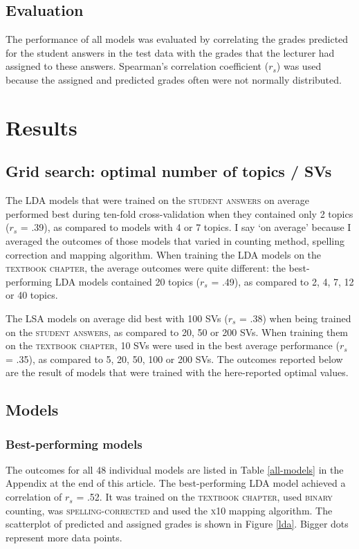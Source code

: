 \documentclass[a4paper,10pt,twoside]{article}
\begin{document}
\subsection{Evaluation}
\label{sec:evaluation}
The performance of all models was evaluated by correlating the grades predicted for the student answers in the test data with the grades that the lecturer had assigned to these answers. Spearman's correlation coefficient ($\textit{r}_s$) was used because the assigned and predicted grades often were not normally distributed.

\section{Results}

\subsection{Grid search: optimal number of topics / SVs}
The LDA models that were trained on the \textsc{student answers} on average performed best during ten-fold cross-validation when they contained only 2 topics ($\textit{r}_s$ = .39), as compared to models with 4 or 7 topics. I say `on average' because I averaged the outcomes of those models that varied in counting method, spelling correction and mapping algorithm. When training the LDA models on the \textsc{textbook chapter}, the average outcomes were quite different: the best-performing LDA models contained 20 topics ($\textit{r}_s$ = .49), as compared to 2, 4, 7, 12 or 40 topics.

The LSA models on average did best with 100 SVs ($\textit{r}_s$ = .38) when being trained on the \textsc{student answers}, as compared to 20, 50 or 200 SVs. When training them on the \textsc{textbook chapter}, 10 SVs were used in the best average performance ($\textit{r}_s$ = .35), as compared to 5, 20, 50, 100 or 200 SVs. The outcomes reported below are the result of models that were trained with the here-reported optimal values.

\subsection{Models}

\subsubsection{Best-performing models}
The outcomes for all 48 individual models are listed in Table \ref{all-models} in the Appendix at the end of this article. The best-performing LDA model achieved a correlation of $\textit{r}_s$ = .52. It was trained on the \textsc{textbook chapter}, used \textsc{binary} counting, was \textsc{spelling-corrected} and used the \textsc{x10} mapping algorithm. The scatterplot of predicted and assigned grades is shown in Figure \ref{lda}.
Bigger dots represent more data points.
\end{document}
